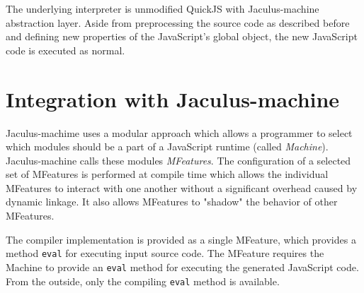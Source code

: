 The underlying interpreter is unmodified QuickJS with Jaculus-machine abstraction layer. Aside from preprocessing the source code as described before and defining new properties of the JavaScript's global object, the new JavaScript code is executed as normal.

\section{Integration with Jaculus-machine}

Jaculus-machime uses a modular approach which allows a programmer to select which modules should be a part of a JavaScript runtime (called \textit{Machine}). Jaculus-machine calls these modules \textit{MFeatures}. The configuration of a selected set of MFeatures is performed at compile time which allows the individual MFeatures to interact with one another without a significant overhead caused by dynamic linkage. It also allows MFeatures to "shadow" the behavior of other MFeatures.

The compiler implementation is provided as a single MFeature, which provides a method \texttt{eval} for executing input source code. The MFeature requires the Machine to provide an \texttt{eval} method for executing the generated JavaScript code. From the outside, only the compiling \texttt{eval} method is available.
